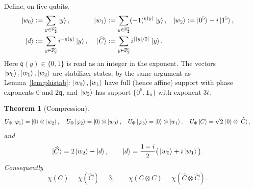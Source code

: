 \documentclass[11pt]{article}
\theoremstyle{plain}
\newtheorem{theorem}{Theorem}[section]
\theoremstyle{definition}
\newcommand{\F}{\mathbb{F}}
\newcommand{\qq}{\mathsf{q}}
\newcommand{\one}{\mathbf{1}}
\newcommand{\wt}[1]{\lvert #1\rvert}
\begin{document}
Define, on five qubits,
\begin{align}
\ket{w_0}&:=\sum_{y\in\F_2^5}\ket y, &
\ket{w_1}&:=\sum_{y\in\F_2^5}(-1)^{\qq(y)}\ket y, &
\ket{w_2}&:=\ket{0^5}-i\ket{1^5},\label{eq:ws}\\
\ket d&:=\sum_{y\in\F_2^5}i^{-\qq(y)}\ket y, &
\ket{\widehat C}&:=\sum_{y\in\F_2^5}i^{\lceil \wt y/2\rceil}\ket y. & &
\label{eq:dC}
\end{align}
Here $\qq(y)\in\{0,1\}$ is read as an integer in the exponent. The vectors
$\ket{w_0},\ket{w_1},\ket{w_2}$ are stabilizer states, by the same argument as
Lemma~\ref{lem:phistab}: $\ket{w_0},\ket{w_1}$ have full (hence affine) support with
phase exponents $0$ and $2\qq$, and $\ket{w_2}$ has support $\{0^5,\one_5\}$ with
exponent $3t$.

\begin{theorem}[Compression]\label{thm:compress}
\begin{equation}\label{eq:compress}
U_\Phi\ket{\varphi_1}=\ket0\otimes\ket{w_2},\quad
U_\Phi\ket{\varphi_2}=\ket0\otimes\ket{w_0},\quad
U_\Phi\ket{\varphi_3}=\ket0\otimes\ket{w_1},\quad
U_\Phi\ket{C}=\sqrt2\,\ket0\otimes\ket{\widehat C},
\end{equation}
and
\begin{equation}\label{eq:Chat}
\ket{\widehat C}=2\ket{w_2}-\ket d,\qquad
\ket d=\frac{1-i}{2}\big(\ket{w_0}+i\ket{w_1}\big).
\end{equation}
Consequently
\begin{equation}\label{eq:chieq}
\chi(C)=\chi(\widehat C)=3,\qquad
\chi(C\otimes C)=\chi(\widehat C\otimes\widehat C).
\end{equation}
\end{theorem}
\end{document}
